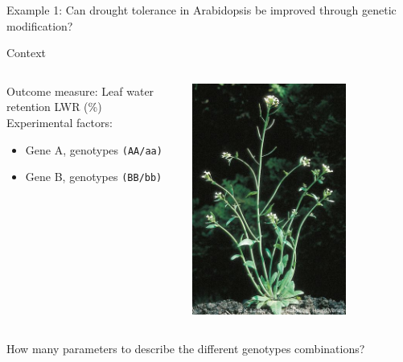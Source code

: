 \documentclass[10pt]{beamer}
\begin{document}
\begin{frame}{Example 1: Can drought tolerance in Arabidopsis be improved through genetic modification?}

\begin{block}{Context}
\begin{columns}
 \begin{column}{0.8\textwidth}
  Outcome measure: Leaf water retention LWR (\%)\\
  Experimental factors:
    \begin{itemize}
     \item Gene A, genotypes \texttt{(AA/aa)}
     \item Gene B, genotypes \texttt{(BB/bb)}
    \end{itemize}
   \end{column}
   \begin{column}{0.2\textwidth}
    \includegraphics[width=0.7\textwidth]{Figures/arabid}
    
   \end{column}

   \end{columns}
   
\end{block}
How many parameters to describe the different genotypes combinations?
        

\end{frame}
\end{document}
